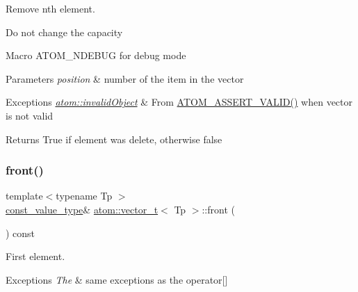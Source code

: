 Remove nth element. 

Do not change the capacity

Macro A\+T\+O\+M\+\_\+\+N\+D\+E\+B\+UG for debug mode 
\begin{DoxyParams}{Parameters}
{\em position} & number of the item in the vector \\
\hline
\end{DoxyParams}

\begin{DoxyExceptions}{Exceptions}
{\em \hyperlink{classatom_1_1invalid_object}{atom\+::invalid\+Object}} & From \hyperlink{debug__tools_8h_a273b49426c51bc6a7eb989ee0acbdc6b}{A\+T\+O\+M\+\_\+\+A\+S\+S\+E\+R\+T\+\_\+\+V\+A\+L\+I\+D()} when vector is not valid \\
\hline
\end{DoxyExceptions}
\begin{DoxyReturn}{Returns}
True if element was delete, otherwise false 
\end{DoxyReturn}
\mbox{\label{classatom_1_1vector__t_a1c0df3e4399ea92d4213986c2e5359bf}} 
\subsubsection{\texorpdfstring{front()}{front()}}
{\footnotesize\ttfamily template$<$typename Tp $>$ \\
\hyperlink{classatom_1_1vector__t_a14fe7ee127e522f41f345462311c924e}{const\+\_\+value\+\_\+type}\& \hyperlink{classatom_1_1vector__t}{atom\+::vector\+\_\+t}$<$ Tp $>$\+::front (\begin{DoxyParamCaption}{ }\end{DoxyParamCaption}) const\hspace{0.3cm}{\ttfamily [inline]}}



First element. 


\begin{DoxyExceptions}{Exceptions}
{\em The} & same exceptions as the operator\mbox{[}\mbox{]} \\
\hline
\end{DoxyExceptions}
\mbox{\label{classatom_1_1vector__t_a16a4c8f9d44c9878affca542eba877d3}} 
